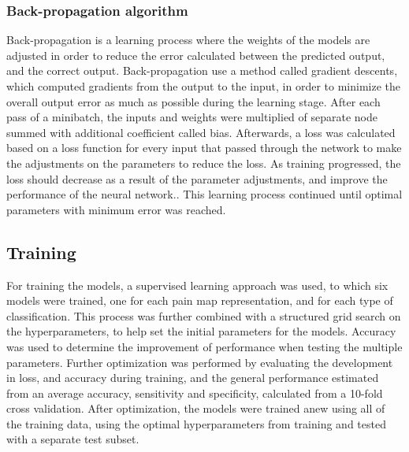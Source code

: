 \subsubsection*{\textbf{Back-propagation algorithm}}
Back-propagation is a learning process where the weights of the models are adjusted in order to reduce the error calculated between the predicted output, and the correct output. \citep{Duda2000} Back-propagation use a method called gradient descents, which computed gradients from the output to the input, in order to minimize the overall output error as much as possible during the learning stage. 
After each pass of a minibatch, the inputs and weights were multiplied of separate node summed with additional coefficient called bias.\citep{Hameed2016,LeCun1998}
Afterwards, a loss was calculated based on a loss function for every input that passed through the network to make the adjustments on the parameters to reduce the loss. As training progressed, the loss should decrease as a result of the parameter adjustments, and improve the performance of the neural network.\citep{LeCun2015, Goodfellow2016, Duda2000}. This learning process continued until optimal parameters with minimum error was reached.\citep{Hameed2016}

\subsection*{\textbf{Training}}
For training the models, a supervised learning approach was used, to which six models were trained, one for each pain map representation, and for each type of classification.  
This process was further combined with a structured grid search on the hyperparameters, to help set the initial parameters for the models. Accuracy was used to determine the improvement of performance when testing the multiple parameters.
Further optimization was performed by evaluating the development in loss, and accuracy during training, and the general performance estimated from an average accuracy, sensitivity and specificity, calculated from a 10-fold cross validation. After optimization, the models were trained anew using all of the training data, using the optimal hyperparameters from training and tested with a separate test subset.   




